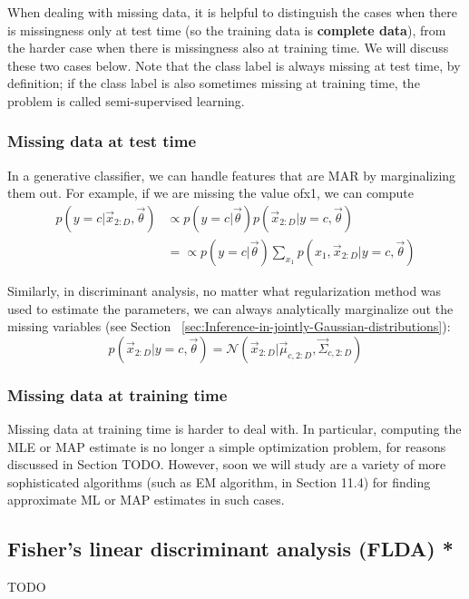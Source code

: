 When dealing with missing data, it is helpful to distinguish the cases when there is missingness only at test time (so the training data is \textbf{complete data}), from the harder case when there is missingness also at training time. We will discuss these two cases below. Note that the class label is always missing at test time, by definition; if the class label is also sometimes missing at training time, the problem is called semi-supervised learning.


\subsubsection{Missing data at test time}
In a generative classifier, we can handle features that are MAR by marginalizing them out. For example, if we are missing the value ofx1, we can compute
\begin{align}
p(y=c|\vec{x}_{2:D},\vec{\theta}) & \propto p(y=c|\vec{\theta})p(\vec{x}_{2:D}|y=c,\vec{\theta}) \\
      & = \propto p(y=c|\vec{\theta})\sum\limits_{x_1}p(x_1, \vec{x}_{2:D}|y=c,\vec{\theta})
\end{align}

Similarly, in discriminant analysis, no matter what regularization method was used to estimate the parameters, we can always analytically marginalize out the missing variables (see Section ~\ref{sec:Inference-in-jointly-Gaussian-distributions}):
\begin{equation}
p(\vec{x}_{2:D}|y=c,\vec{\theta})=\mathcal{N}(\vec{x}_{2:D}|\vec{\mu}_{c,2:D},\vec{\Sigma}_{c,2:D})
\end{equation}


\subsubsection{Missing data at training time}
Missing data at training time is harder to deal with. In particular, computing the MLE or MAP estimate is no longer a simple optimization problem, for reasons discussed in Section TODO. However, soon we will study are a variety of more sophisticated algorithms (such as EM algorithm, in Section 11.4) for finding approximate ML or MAP estimates in such cases.


\subsection{Fisher’s linear discriminant analysis (FLDA) *}
TODO